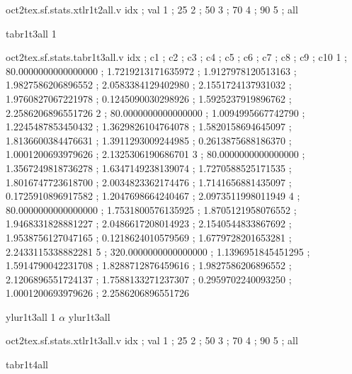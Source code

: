 \begin{filecontents}[overwrite]{oct2tex.sf.stats.xtlr1t2all.v}
idx ; val
1 ; 25
2 ; 50
3 ; 70
4 ; 90
5 ; all
\end{filecontents}
\expandafter\def\csname oct2tex.sf.stats.tabr1t3all.t\endcsname{tabr1t3all}
\expandafter\def\csname oct2tex.sf.stats.tabr1t3all.u\endcsname{1}
\begin{filecontents}[overwrite]{oct2tex.sf.stats.tabr1t3all.v}
idx ; c1 ; c2 ; c3 ; c4 ; c5 ; c6 ; c7 ; c8 ; c9 ; c10
1 ; 80.0000000000000000 ; 1.7219213171635972 ; 1.9127978120513163 ; 1.9827586206896552 ; 2.0583384129402980 ; 2.1551724137931032 ; 1.9760827067221978 ; 0.1245090030298926 ; 1.5925237919896762 ; 2.2586206896551726
2 ; 80.0000000000000000 ; 1.0094995667742790 ; 1.2245487853450432 ; 1.3629826104764078 ; 1.5820158694645097 ; 1.8136600384476631 ; 1.3911293009244985 ; 0.2613875688186370 ; 1.0001200693979626 ; 2.1325306190686701
3 ; 80.0000000000000000 ; 1.3567249818736278 ; 1.6347149238139074 ; 1.7270588525171535 ; 1.8016747723618700 ; 2.0034823362174476 ; 1.7141656881435097 ; 0.1725910896917582 ; 1.2047698664240467 ; 2.0973511998011949
4 ; 80.0000000000000000 ; 1.7531800576135925 ; 1.8705121958076552 ; 1.9468331828881227 ; 2.0486617208014923 ; 2.1540544833867692 ; 1.9538756127047165 ; 0.1218624010579569 ; 1.6779728201653281 ; 2.2433115338882281
5 ; 320.0000000000000000 ; 1.1396951845451295 ; 1.5914790042231708 ; 1.8288712876459616 ; 1.9827586206896552 ; 2.1206896551724137 ; 1.7588133271237307 ; 0.2959702240093250 ; 1.0001200693979626 ; 2.2586206896551726
\end{filecontents}
\expandafter\def\csname oct2tex.sf.stats.ylur1t3all.t\endcsname{ylur1t3all}
\expandafter\def\csname oct2tex.sf.stats.ylur1t3all.u\endcsname{1}
\expandafter\def\csname oct2tex.sf.stats.ylur1t3all.v\endcsname{$\alpha$}
\expandafter\def\csname oct2tex.sf.stats.xtlr1t3all.t\endcsname{ylur1t3all}
\begin{filecontents}[overwrite]{oct2tex.sf.stats.xtlr1t3all.v}
idx ; val
1 ; 25
2 ; 50
3 ; 70
4 ; 90
5 ; all
\end{filecontents}
\expandafter\def\csname oct2tex.sf.stats.tabr1t4all.t\endcsname{tabr1t4all}
